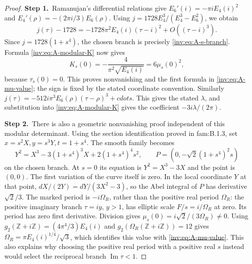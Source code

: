 \begin{proof}
\par\smallskip\noindent\textbf{Step 1.}\ Ramanujan's differential relations give
$E_6'(i)=-\pi i E_4(i)^2$ and
$E_4'(\rho)=-(2\pi i/3)E_6(\rho)$.
Using $j=1728E_4^3/(E_4^3-E_6^2)$, we obtain
\[
j(\tau)-1728=-1728\pi^2E_4(i)(\tau-i)^2+O((\tau-i)^3).
\]
Since $j=1728(1+s^4)$, the chosen branch is precisely
\eqref{inv:eq:A-s-branch}.  Formula \eqref{inv:eq:A-modular-K} now gives
\[
K_s(0)=-\frac4{\pi^2\sqrt{E_4(i)}}=6\mu_s(0)^2,
\]
because $\tau_s(0)=0$.  This proves nonvanishing and the first
formula in \eqref{inv:eq:A-mu-value}; the sign is fixed by the stated
coordinate convention.  Similarly
$j(\tau)=-512i\pi^3E_6(\rho)(\tau-\rho)^3+cdots$.
This gives the stated $\lambda$, and substitution into
\eqref{inv:eq:A-modular-K} gives the coefficient $-3i\lambda/(2\pi)$.

\par\smallskip\noindent\textbf{Step 2.}\ There is also a geometric nonvanishing proof independent of this
modular determinant.  Using the section identification proved in
fam:B.1.3, set $x=s^2X,y=s^3Y,t=1+s^4$.  The smooth family becomes
\[
Y^2=X^3-3(1+s^4)^3X+2(1+s^4)^4s^2,
\qquad P=(0,-\sqrt2(1+s^4)^2s)
\]
on the chosen branch.  At $s=0$ its equation is
$Y^2=X^3-3X$ and the point is $(0,0)$.  The first variation of the
curve itself is zero.  In the local coordinate $Y$ at that point,
$dX/(2Y)=dY/(3X^2-3)$, so the Abel integral of $P$ has derivative
$\sqrt2/3$.  The marked period is $-i\Omega_R$, rather than the
positive real period $\Omega_R$: the positive imaginary branch
$\tau=iy$, $y>1$, has elliptic scale $F/s=i/\Omega_R$ at zero.
Its period has zero first derivative.  Division gives
$\mu_s(0)=i\sqrt2/(3\Omega_R)\ne0$.
Using $g_2(\mathbb Z+i\mathbb Z)=(4\pi^4/3)E_4(i)$ and
$g_2(\Omega_R(\mathbb Z+i\mathbb Z))=12$ gives
$\Omega_R=\pi E_4(i)^{1/4}/\sqrt3$, which identifies this value
with \eqref{inv:eq:A-mu-value}.  This also explains why choosing the
positive real period with a positive real $s$ instead would select
the reciprocal branch $\operatorname{Im}\tau<1$.


\end{proof}
